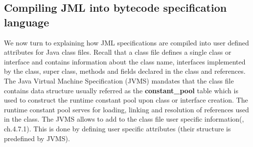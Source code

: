 \subsection{Compiling JML into bytecode specification language}\label{comJML}


We now turn to explaining how JML specifications are compiled into user defined attributes for Java class files. Recall that a class file defines
a single class or interface and contains information about  the class name, interfaces implemented by the class, super class, methods and fields declared in the class and references. The Java Virtual Machine Specification (JVMS) \cite{VMSpec} mandates that the class file contains data structure usually referred as the \textbf{constant\_pool} table which is used to construct the runtime constant pool upon class or interface creation. The runtime constant pool serves for loading, linking and resolution of references used in the class. The JVMS allows to add to the class file user specific information(\cite{VMSpec}, ch.4.7.1). This is done by defining user specific attributes  (their structure is predefined by JVMS).

